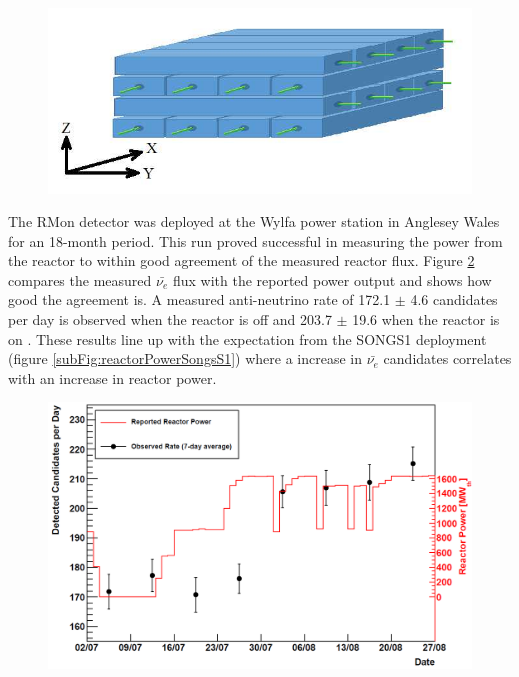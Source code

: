 \begin{figure}[!h]
\centering
  \centering
  \includegraphics[width=0.6\linewidth]{Chapter2/Figs/Raster/VIDARR_diagram.jpeg}
  \label{fig:vidarrDiagram}
\end{figure}

The RMon detector was deployed at the Wylfa power station in Anglesey Wales for an 18-month period. This run proved successful in measuring the power from the reactor to within good agreement of the measured reactor flux. Figure \ref{fig:prototypeMeasumentFlux} compares the measured $\bar{\nu_e}$ flux with the reported power output and shows how good the agreement is. A measured anti-neutrino rate of 172.1 $\pm$ 4.6 candidates per day is observed when the reactor is off and 203.7 $\pm$ 19.6 when the reactor is on \cite{Carroll_2018}. These results line up with the expectation from the SONGS1 deployment (figure \ref{subFig:reactorPowerSongsS1}) where a increase in $\bar{\nu_e}$ candidates correlates with an increase in reactor power. %
\begin{figure}[!h]
 \centering
 \includegraphics[width=0.7\linewidth]{Chapter2/Figs/Raster/prototypeMeasureOnFig.png} 
 \label{fig:prototypeMeasumentFlux}
\end{figure}

